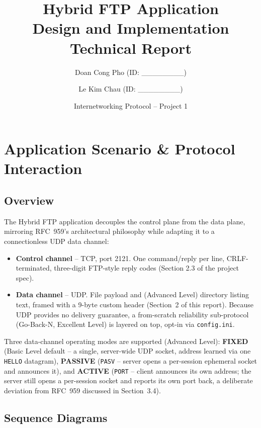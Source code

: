\documentclass[11pt]{article}
\title{\textbf{Hybrid FTP Application}\\[4pt]\large Design and Implementation Technical Report}
\author{%
  Doan Cong Pho (ID: \_\_\_\_\_\_\_\_) \and Le Kim Chau (ID: \_\_\_\_\_\_\_\_)
}
\date{Internetworking Protocol -- Project 1}
\begin{document}
\maketitle
\tableofcontents
\newpage

\section{Application Scenario \& Protocol Interaction}

\subsection{Overview}

The Hybrid FTP application decouples the control plane from the data plane, mirroring
RFC~959's architectural philosophy while adapting it to a connectionless UDP data
channel:

\begin{itemize}
    \item \textbf{Control channel} -- TCP, port 2121. One command/reply per line,
          CRLF-terminated, three-digit FTP-style reply codes (Section 2.3 of the
          project spec).
    \item \textbf{Data channel} -- UDP. File payload and (Advanced Level) directory
          listing text, framed with a 9-byte custom header (Section~2 of this report).
          Because UDP provides no delivery guarantee, a from-scratch reliability
          sub-protocol (Go-Back-N, Excellent Level) is layered on top, opt-in via
          \texttt{config.ini}.
\end{itemize}

Three data-channel operating modes are supported (Advanced Level): \textbf{FIXED}
(Basic Level default -- a single, server-wide UDP socket, address learned via one
\texttt{HELLO} datagram), \textbf{PASSIVE} (\texttt{PASV} -- server opens a
per-session ephemeral socket and announces it), and \textbf{ACTIVE} (\texttt{PORT} --
client announces its own address; the server still opens a per-session socket and
reports its own port back, a deliberate deviation from RFC~959 discussed in
Section~3.4).

\subsection{Sequence Diagrams}
\end{document}
